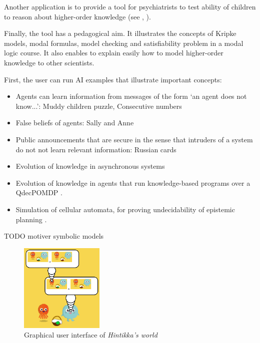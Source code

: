 \documentclass{article}
\begin{document}
Another application is to provide a tool for psychiatrists to test ability of children to reason about higher-order knowledge (see \cite{DBLP:conf/cogsci/ArslanVTH15}, \cite{wimmer1983beliefs}).

Finally, the tool has a pedagogical aim. It illustrates the concepts of Kripke models, modal formulas, model checking and satisfiability problem in a modal logic course. It also enables to explain easily 
how to model higher-order knowledge to other scientists.

First, the user can run AI examples that illustrate important concepts:

\begin{itemize}
	\item Agents can learn information from messages of the form `an agent does not know...': Muddy children puzzle, Consecutive numbers \cite{van2015one}
	\item False beliefs of agents: Sally and Anne \cite{wimmer1983beliefs}
	\item Public announcements that are secure in the sense that intruders of a system do not not learn relevant information: Russian cards \cite{DBLP:journals/sLogica/Ditmarsch03}
	\item Evolution of knowledge in asynchronous systems \cite{knight_maubert_schwarzentruber_2017}
	\item Evolution of knowledge in agents that run knowledge-based programs over a QdecPOMDP \cite{AAAI2018kbps}.
	\item Simulation of cellular automata, for proving undecidability of epistemic planning \cite{ijcai2018SmallUndecidableEpistemicPlanning}.
\end{itemize} 

TODO motiver symbolic models






\begin{figure}
	\begin{center}
		\includegraphics[width=4cm]{screenshot.png}
	\end{center}
	\caption{Graphical user interface of \emph{Hintikka's world}\label{figure:gui}}
\end{figure}
\end{document}
